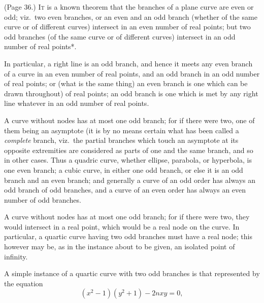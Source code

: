 \documentclass[11pt,a4paper]{article}
\begin{document}
\medskip

\noindent (Page 36.) \textsc{It} is a known theorem that the branches of a plane curve are even or odd; viz.\ two even branches, or an even and an odd branch (whether of the same curve or of different curves) intersect in an even number of real points; but two odd branches (of the same curve or of different curves) intersect in an odd number of real points*.

In particular, a right line is an odd branch, and hence it meets any even branch of a curve in an even number of real points, and an odd branch in an odd number of real points; or (what is the same thing) an even branch is one which can be drawn throughout) of real points; an odd branch is one which is met by any right line whatever in an odd number of real points.

A curve without nodes has at most one odd branch; for if there were two, one of them being an asymptote (it is by no means certain what has been called a \emph{complete} branch, viz.\ the partial branches which touch an asymptote at its opposite extremities are considered as parts of one and the same branch, and so in other cases. Thus a quadric curve, whether ellipse, parabola, or hyperbola, is one even branch; a cubic curve, in either one odd branch, or else it is an odd branch and an even branch; and generally a curve of an odd order has always an odd branch of odd branches, and a curve of an even order has always an even number of odd branches.

A curve without nodes has at most one odd branch; for if there were two, they would intersect in a real point, which would be a real node on the curve. In particular, a quartic curve having two odd branches must have a real node; this however may be, as in the instance about to be given, an isolated point of infinity.

A simple instance of a quartic curve with two odd branches is that represented by the equation
\[
(x^2 - 1)(y^2 + 1) - 2nxy = 0,
\]

\bigskip


\bigskip
\end{document}
